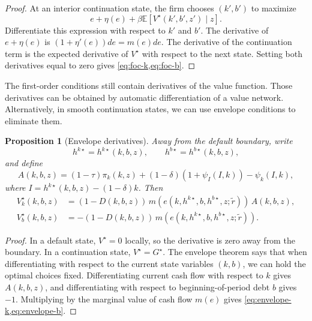 \documentclass[11pt]{article}
\newtheorem{proposition}{Proposition}
\newcommand{\E}{\mathbb{E}}
\newcommand{\1}{\mathbf{1}}
\begin{document}
\begin{proof}
At an interior continuation state, the firm chooses \((k',b')\) to maximize
\[
  e+\eta(e)+\beta \E[V^\star(k',b',z')\mid z].
\]
Differentiate this expression with respect to \(k'\) and \(b'\). The derivative
of \(e+\eta(e)\) is \((1+\eta'(e))de=m(e)de\). The derivative of the continuation
term is the expected derivative of \(V^\star\) with respect to the next state.
Setting both derivatives equal to zero gives
\cref{eq:foc-k,eq:foc-b}.
\end{proof}

The first-order conditions still contain derivatives of the value function.
Those derivatives can be obtained by automatic differentiation of a value
network. Alternatively, in smooth continuation states, we can use envelope
conditions to eliminate them.

\begin{proposition}[Envelope derivatives]
\label{prop:envelope-derivatives}
Away from the default boundary, write
\[
  h^{k\star}=h^{k\star}(k,b,z),
  \qquad
  h^{b\star}=h^{b\star}(k,b,z),
\]
and define
\[
  A(k,b,z)
  =
  (1-\tau)\pi_k(k,z)
  +(1-\delta)(1+\psi_I(I,k))
  -\psi_k(I,k),
\]
where \(I=h^{k\star}(k,b,z)-(1-\delta)k\). Then
\begin{align}
  V^\star_k(k,b,z)
  &=
  (1-D(k,b,z))\,m(e(k,h^{k\star},b,h^{b\star},z;\widetilde r))\,A(k,b,z),
  \label{eq:envelope-k}\\
  V^\star_b(k,b,z)
  &=
  -(1-D(k,b,z))\,m(e(k,h^{k\star},b,h^{b\star},z;\widetilde r)).
  \label{eq:envelope-b}
\end{align}
\end{proposition}

\begin{proof}
In a default state, \(V^\star=0\) locally, so the derivative is zero away from
the boundary. In a continuation state, \(V^\star=G^\star\). The envelope theorem
says that when differentiating with respect to the current state variables
\((k,b)\), we can hold the optimal choices fixed. Differentiating current cash
flow with respect to \(k\) gives \(A(k,b,z)\), and differentiating with respect
to beginning-of-period debt \(b\) gives \(-1\). Multiplying by the marginal value
of cash flow \(m(e)\) gives \cref{eq:envelope-k,eq:envelope-b}.
\end{proof}
\end{document}
